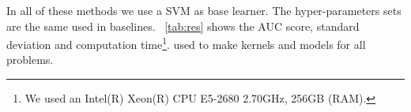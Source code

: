 \documentclass{esannV2}
\newcommand{\1}{{\bf 1}}
\newcommand{\res}[2]{$#1_{\pm#2}$}
\newcommand{\kval}{$K_{\textsc{val}}$}
\newcommand{\ksum}{$K_{\textsc{sum}}$}
\newcommand{\kmkl}{$K_{\textsc{mkl}}$}
\newcommand{\ksmkl}{$K_{\textsc{mkl}}^{sub}$}
\newcommand{\kssum}{$K_{\textsc{sum}}^{sub}$}
\newcommand{\ksw}{$K_{\textsc{w}}^{sub}$}
\newcommand{\tb}[1]{\boldsymbol{#1}}
\begin{document}
In all of these methods we use a SVM as base learner. The hyper-parameters sets are the same used in baselines.
\tablename\ \ref{tab:res} shows the AUC score, standard deviation and computation time\footnote{We used an Intel(R) Xeon(R) CPU E5-2680 2.70GHz, 256GB (RAM).}.
 used to make kernels and models for all problems.
%
\end{document}
